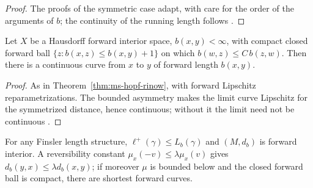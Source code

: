 \begin{proof}
  \leanok
  The proofs of the symmetric case adapt, with care for the order of the arguments of $b$; the
  continuity of the running length follows \cite[Appendix~B.2]{Men13}.
\end{proof}

\begin{theorem}
  \label{thm:ms-fwd-hopf-rinow}
  \leanok
  Let $X$ be a Hausdorff forward interior space, $b(x, y) < \infty$, with compact closed forward
  ball $\{z : b(x, z) \leq b(x, y) + 1\}$ on which $b(w, z) \leq C\, b(z, w)$. Then there is a
  continuous curve from $x$ to $y$ of forward length $b(x, y)$.
\end{theorem}

\begin{proof}
  \leanok
  As in Theorem~\ref{thm:ms-hopf-rinow}, with forward Lipschitz reparametrizations. The bounded
  asymmetry makes the limit curve Lipschitz for the symmetrized distance, hence continuous; without
  it the limit need not be continuous \cite{Men13}.
\end{proof}

\begin{theorem}
  \label{thm:ms-finsler-asymm}
  \leanok
  For any Finsler length structure, $\ell^+(\gamma) \leq L_b(\gamma)$ and $(M, d_b)$ is forward
  interior. A reversibility constant $\mu_x(-v) \leq \lambda \mu_x(v)$ gives
  $d_b(y, x) \leq \lambda d_b(x, y)$; if moreover $\mu$ is bounded below and the closed forward
  ball is compact, there are shortest forward curves.
\end{theorem}

